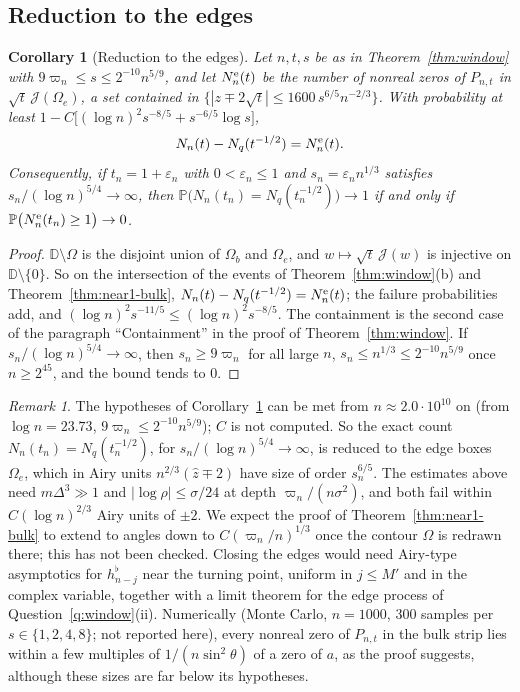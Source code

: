 \documentclass[11pt]{amsart}
\newtheorem{corollary}[theorem]{Corollary}
\theoremstyle{definition}
\theoremstyle{remark}
\newtheorem{remark}[theorem]{Remark}
\numberwithin{equation}{section}
\newcommand{\D}{\mathbb{D}}
\newcommand{\PP}{\mathbb{P}}
\newcommand{\eps}{\varepsilon}
\begin{document}
\subsection{Reduction to the edges}

\begin{corollary}[Reduction to the edges]\label{cor:near1-edge}
Let $n,t,s$ be as in Theorem~\ref{thm:window} with $9\varpi_n\le s\le2^{-10}n^{5/9}$, and let $N_n^{\rm e}(t)$ be the number of nonreal zeros of $P_{n,t}$ in $\sqrt t\,\mathcal J(\Omega_e)$, a set contained in $\{|z\mp2\sqrt t|\le1600\,s^{6/5}n^{-2/3}\}$. With probability at least $1-C\bigl[(\log n)^2s^{-8/5}+s^{-6/5}\log s\bigr]$,
\[
N_n(t)-N_q(t^{-1/2})=N_n^{\rm e}(t).
\]
Consequently, if $t_n=1+\eps_n$ with $0<\eps_n\le1$ and $s_n=\eps_nn^{1/3}$ satisfies $s_n/(\log n)^{5/4}\to\infty$, then $\PP\bigl(N_n(t_n)=N_q(t_n^{-1/2})\bigr)\to1$ if and only if $\PP\bigl(N_n^{\rm e}(t_n)\ge1\bigr)\to0$.
\end{corollary}

\begin{proof}
$\D\setminus\Omega$ is the disjoint union of $\Omega_b$ and $\Omega_e$, and $w\mapsto\sqrt t\,\mathcal J(w)$ is injective on $\D\setminus\{0\}$. So on the intersection of the events of Theorem~\ref{thm:window}(b) and Theorem~\ref{thm:near1-bulk}, $N_n(t)-N_q(t^{-1/2})=N_n^{\rm e}(t)$; the failure probabilities add, and $(\log n)^2s^{-11/5}\le(\log n)^2s^{-8/5}$. The containment is the second case of the paragraph ``Containment'' in the proof of Theorem~\ref{thm:window}. If $s_n/(\log n)^{5/4}\to\infty$, then $s_n\ge9\varpi_n$ for all large $n$, $s_n\le n^{1/3}\le2^{-10}n^{5/9}$ once $n\ge2^{45}$, and the bound tends to $0$.
\end{proof}

\begin{remark}\label{rem:near1-edge}
The hypotheses of Corollary~\ref{cor:near1-edge} can be met from $n\approx2.0\cdot10^{10}$ on (from $\log n=23.73$, $9\varpi_n\le2^{-10}n^{5/9}$); $C$ is not computed. So the exact count $N_n(t_n)=N_q(t_n^{-1/2})$, for $s_n/(\log n)^{5/4}\to\infty$, is reduced to the edge boxes $\Omega_e$, which in Airy units $n^{2/3}(\hat z\mp2)$ have size of order $s_n^{6/5}$. The estimates above need $m\Delta^3\gg1$ and $|\log\rho|\le\sigma/24$ at depth $\varpi_n/(n\sigma^2)$, and both fail within $C(\log n)^{2/3}$ Airy units of $\pm2$. We expect the proof of Theorem~\ref{thm:near1-bulk} to extend to angles down to $C(\varpi_n/n)^{1/3}$ once the contour $\Omega$ is redrawn there; this has not been checked. Closing the edges would need Airy-type asymptotics for $h_{n-j}^\flat$ near the turning point, uniform in $j\le M'$ and in the complex variable, together with a limit theorem for the edge process of Question~\ref{q:window}(ii). Numerically (Monte Carlo, $n=1000$, $300$ samples per $s\in\{1,2,4,8\}$; not reported here), every nonreal zero of $P_{n,t}$ in the bulk strip lies within a few multiples of $1/(n\sin^2\theta)$ of a zero of $a$, as the proof suggests, although these sizes are far below its hypotheses.
\end{remark}
\end{document}
